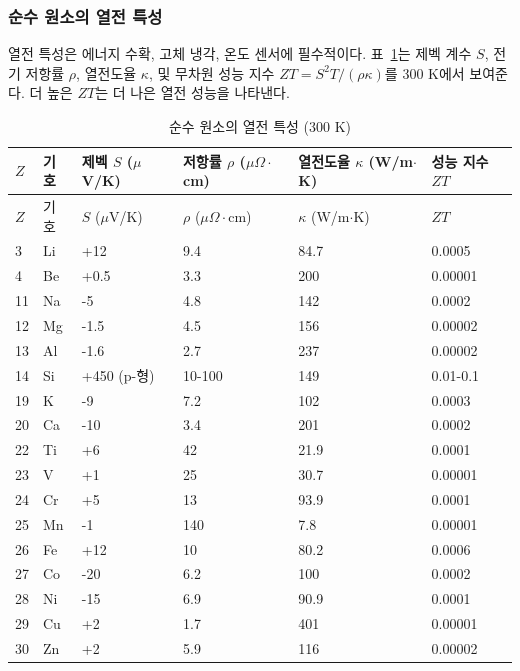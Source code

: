 \documentclass[12pt,a4paper]{article}
\begin{document}
	\subsubsection{순수 원소의 열전 특성}
	\label{subsec:thermoelectric-properties-func}
	
	열전 특성은 에너지 수확, 고체 냉각, 온도 센서에 필수적이다. 표~\ref{tab:thermoelectric-properties-func}는 제벡 계수 \(S\), 전기 저항률 \(\rho\), 열전도율 \(\kappa\), 및 무차원 성능 지수 \(ZT = S^2 T / (\rho \kappa)\)를 300 K에서 보여준다. 더 높은 \(ZT\)는 더 나은 열전 성능을 나타낸다.
	
	\begin{longtable}{p{0.8cm}p{1.2cm}p{2.2cm}p{2.2cm}p{2.2cm}p{2.2cm}}
		\caption{순수 원소의 열전 특성 (300 K)} \label{tab:thermoelectric-properties-func} \\
		\toprule
		\(Z\) & 기호 & 제벡 \(S\) (\(\mu\)V/K) & 저항률 \(\rho\) (\(\mu\Omega\cdot\)cm) & 열전도율 \(\kappa\) (W/m\(\cdot\)K) & 성능 지수 \(ZT\) \\
		\midrule
		\endfirsthead
		\toprule
		\(Z\) & 기호 & \(S\) (\(\mu\)V/K) & \(\rho\) (\(\mu\Omega\cdot\)cm) & \(\kappa\) (W/m\(\cdot\)K) & \(ZT\) \\
		\midrule
		\endhead
		3  & Li & +12 & 9.4 & 84.7 & 0.0005 \\
		4  & Be & +0.5 & 3.3 & 200 & 0.00001 \\
		11 & Na & -5 & 4.8 & 142 & 0.0002 \\
		12 & Mg & -1.5 & 4.5 & 156 & 0.00002 \\
		13 & Al & -1.6 & 2.7 & 237 & 0.00002 \\
		14 & Si & +450 (p-형) & 10-100 & 149 & 0.01-0.1 \\
		19 & K  & -9 & 7.2 & 102 & 0.0003 \\
		20 & Ca & -10 & 3.4 & 201 & 0.0002 \\
		22 & Ti & +6 & 42 & 21.9 & 0.0001 \\
		23 & V  & +1 & 25 & 30.7 & 0.00001 \\
		24 & Cr & +5 & 13 & 93.9 & 0.0001 \\
		25 & Mn & -1 & 140 & 7.8 & 0.00001 \\
		26 & Fe & +12 & 10 & 80.2 & 0.0006 \\
		27 & Co & -20 & 6.2 & 100 & 0.0002 \\
		28 & Ni & -15 & 6.9 & 90.9 & 0.0001 \\
		29 & Cu & +2 & 1.7 & 401 & 0.00001 \\
		30 & Zn & +2 & 5.9 & 116 & 0.00002 \\

\end{longtable}
\end{document}
